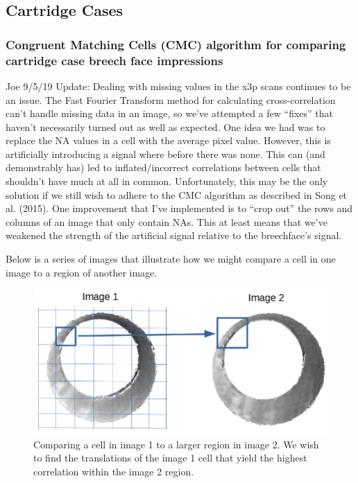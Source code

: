 \documentclass[]{book}
\begin{document}
\hypertarget{cartridge-cases}{%
\subsection{Cartridge Cases}\label{cartridge-cases}}

\hypertarget{congruent-matching-cells-cmc-algorithm-for-comparing-cartridge-case-breech-face-impressions}{%
\subsubsection{Congruent Matching Cells (CMC) algorithm for comparing cartridge case breech face impressions}\label{congruent-matching-cells-cmc-algorithm-for-comparing-cartridge-case-breech-face-impressions}}

Joe 9/5/19 Update: Dealing with missing values in the x3p scans continues to be an issue. The Fast Fourier Transform method for calculating cross-correlation can't handle missing data in an image, so we've attempted a few ``fixes'' that haven't necessarily turned out as well as expected. One idea we had was to replace the NA values in a cell with the average pixel value. However, this is artificially introducing a signal where before there was none. This can (and demonstrably has) led to inflated/incorrect correlations between cells that shouldn't have much at all in common. Unfortunately, this may be the only solution if we still wish to adhere to the CMC algorithm as described in Song et al. (2015). One improvement that I've implemented is to ``crop out'' the rows and columns of an image that only contain NAs. This at least means that we've weakened the strength of the artificial signal relative to the breechface's signal.

Below is a series of images that illustrate how we might compare a cell in one image to a region of another image.

\begin{figure}

{\centering \includegraphics[width=0.5\linewidth]{images/cartridge_cases/im1_im2_cellComparison} 

}

\caption{Comparing a cell in image 1 to a larger region in image 2. We wish to find the translations of the image 1 cell that yield the highest correlation within the image 2 region.}\label{fig:unnamed-chunk-8}
\end{figure}
\end{document}
